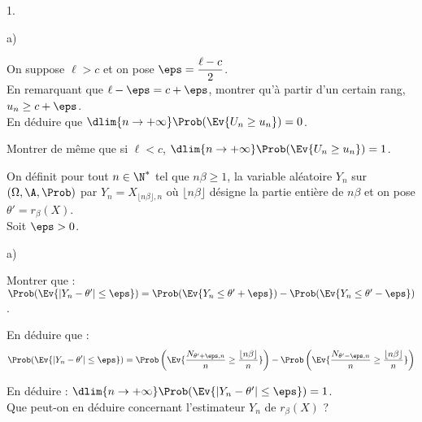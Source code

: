 \documentclass[11pt]{article}%
\begin{document}
\begin{noliste}{1.}
\begin{noliste}{a)}
    

    
    \item On suppose $\ell >c$ et on pose $\eps = 
    \dfrac{\ell-c}{2}$.\\
    En remarquant que $\ell-\eps=c+\eps$, montrer qu'à 
    partir d'un certain rang, $u_n \geq c+\eps$.\\
    En déduire que $\dlim{n \to +\infty}\Prob(\Ev{U_n \geq 
    u_n})=0$. 
    
    
    
    

    
    \item Montrer de même que si $\ell <c$, $\dlim{n 
    \to +\infty} \Prob(\Ev{U_n \geq u_n})=1$. 
    
    
  \end{noliste}

  \item On définit pour tout $n \in \N^*$ tel que $n \beta \geq 1$, 
  la variable aléatoire $Y_n$ sur $(\Omega,\A,\Prob)$ par 
  $Y_n=X_{\lfloor n\beta \rfloor, n}$ où $\lfloor n\beta \rfloor$ 
  désigne la partie entière de $n\beta$ et on pose 
  $\theta'=r_{\beta}(X)$.\\
  Soit $\eps >0$.
  \begin{noliste}{a)}
    \setlength{\itemsep}{2mm}
    \item Montrer que : $\Prob(\Ev{|Y_n-\theta'| \leq
    \eps})=\Prob(\Ev{Y_n \leq \theta'+\eps}) - \Prob(\Ev{Y_n \leq
    \theta'-\eps})$. 
    
    
    
    
    

    
    \item En déduire que :
    \[
     \Prob( \Ev{ |Y_n- \theta' | \leq\eps} )=\Prob\left( \Ev{ 
     \dfrac{N_{\theta'+\eps,n}}{n} \geq \dfrac{\lfloor n\beta 
     \rfloor}{n}} \right)-\Prob\left( \Ev{ 
     \dfrac{N_{\theta'-\eps,n}}{n} \geq \dfrac{\lfloor n\beta 
     \rfloor}{n}} \right)
    \]
    
    
    
    \item En déduire : $\dlim{n \to +\infty} 
    \Prob(\Ev{|Y_n - \theta'| \leq \eps})=1$.\\
    Que peut-on en déduire concernant l'estimateur $Y_n$ de 
    $r_\beta(X)$ ?
    
    
  \end{noliste}
  

\end{noliste}
\end{document}
